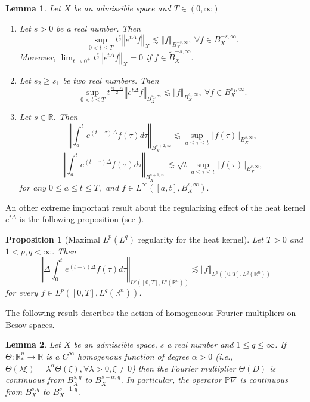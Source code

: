\documentclass[11pt]{amsart}%
\theoremstyle{plain}
\numberwithin{equation}{section}
\newtheorem{lemma}{Lemma}[section]
\newtheorem{proposition}{Proposition}[section]
\begin{document}
\begin{lemma}\label{reg}
Let $X$ be an admissible space and $T\in(0,\infty)$
\begin{enumerate}
\item Let $s>0$ be a real number. Then
\[
\sup_{0<t\leq T}t^{\frac{s}{2}}\left\Vert e^{t\Delta }f\right\Vert
_{X}\lesssim \left\Vert f\right\Vert _{B_{X}^{-s,\infty }},~\forall f\in
B_{X}^{-s,\infty }.
\]%
Moreover, $\lim_{t\rightarrow 0^{+}}t^{\frac{s}{2}}\left\Vert e^{t\Delta
}f\right\Vert _{X}=0$ if $f\in \tilde{B}_{X}^{-s,\infty }.$

\item Let $s_{2}\geq s_{1}$ be two real numbers. Then
\[
\sup_{0<t\leq T}t^{\frac{s_{2}-s_{1}}{2}}\left\Vert e^{t\Delta }f\right\Vert
_{B_{X}^{s_{2},\infty }}\lesssim \left\Vert f\right\Vert
_{B_{X}^{s_{1},\infty }},~\forall f\in B_{X}^{s_{1},\infty }.
\]

\item Let $s\in \mathbb{R}$. Then
\[
\left\Vert \int_{a}^{t}e^{(t-\tau )\Delta }f(\tau )d\tau \right\Vert
_{B_{X}^{s+2,\infty }}\lesssim \sup_{a\leq \tau \leq t}\left\Vert f(\tau
)\right\Vert _{B_{X}^{s,\infty }},
\]%
\[
\left\Vert \int_{a}^{t}e^{(t-\tau )\Delta }f(\tau )d\tau \right\Vert
_{B_{X}^{s+1,\infty }}\lesssim \sqrt{t}\sup_{a\leq \tau \leq t}\left\Vert
f(\tau )\right\Vert _{B_{X}^{s,\infty }},
\]%
for any $0\leq a\leq t\leq T,$ and $f\in L^{\infty }([a,t],B_{X}^{s,\infty
}).$
\end{enumerate}
\end{lemma}
An other extreme important result about the regularizing effect of the heat kernel $e^{t\Delta}$ is the following proposition (see \cite[Theorem 7.3]{Lem2}).
\begin{proposition} [Maximal $L^p(L^q)$ regularity for the heat kernel] \label{max}
Let $T>0 $ and $1<p,q<\infty$. Then
\[
\left\Vert \Delta \int_{0}^{t}e^{(t-\tau )\Delta }f(\tau )d\tau \right\Vert_{L^p([0,T],L^q(\mathbb{R}^n))}\lesssim\left\Vert f \right\Vert_{L^p([0,T],L^q(\mathbb{R}^n))}
\]
for every $f\in L^p([0,T],L^q(\mathbb{R}^n))$.
\end{proposition}
\par\noindent The following result describes the action of homogeneous Fourier multipliers on Besov spaces.
\begin{lemma}\label{Fou}
Let $X$ be an admissible space, $s$ a real number and $1\leq q\leq\infty$. If $\Theta:\mathbb{R}^n_\ast\to\mathbb{R}$ is a $C^\infty$  homogenous function of degree $\alpha>0$ (i.e., $\Theta(\lambda\xi)=\lambda^\alpha\Theta(\xi), \forall \lambda>0, \xi\neq 0$) then the Fourier multiplier $\Theta(D)$ is continuous from $B^{s,q}_X$ to $B^{s-\alpha,q}_X$. In particular, the operator $\mathbb{P}\nabla$ is continuous from $B^{s,q}_X$ to $B^{s-1,q}_X$.
\end{lemma}
\end{document}
